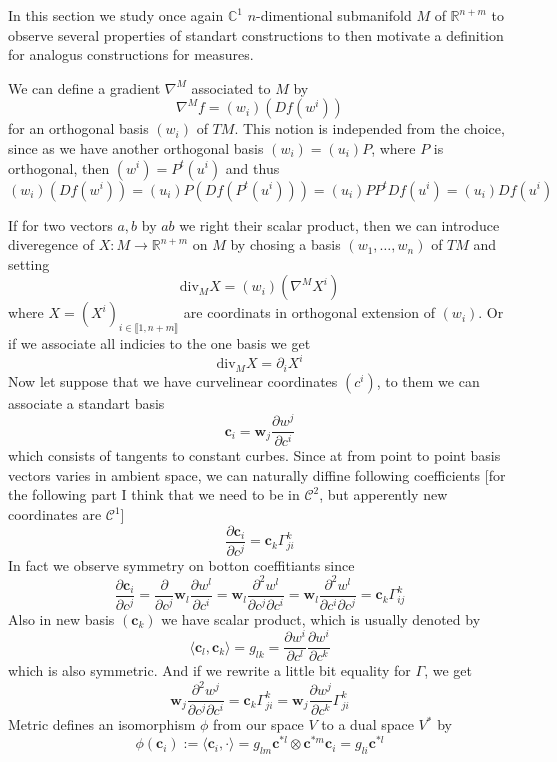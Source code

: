 In this section we study once again $\mathbb C^1$ $n$-dimentional submanifold $M$
of $\mathbb R^{n+m}$ to observe several properties of standart constructions to
then motivate a definition for analogus constructions for measures.

\vspace{2ex}
We can define a gradient $\nabla^M$ associated to $M$ by
\[\nabla^M f = (w_i)(Df(w^i))\]
for an orthogonal basis $(w_i)$ of $TM$. This notion is independed from the choice,
since as we have another orthogonal basis $(w_i)=(u_i)P$, where $P$ is orthogonal, 
then $(w^i)=P^t(u^i)$ and thus $(w_i)(Df(w^i))=(u_i)P(Df(P^t(u^i)))=(u_i)PP^tDf(u^i)=(u_i)Df(u^i)$

\vspace{2ex}
If for two vectors $a,b$ by $ab$ we right their scalar product, then we can
introduce diveregence of $X:M\rightarrow\mathbb R^{n+m}$ on $M$ by chosing
a basis $(w_1,\ldots,w_n)$ of $TM$ and setting
\[\text{div}_MX=(w_i)(\nabla^MX^i)\]
where $X=(X^i)_{i\in\llbracket1,n+m\rrbracket}$ are coordinats in orthogonal
extension of $(w_i)$. Or if we associate all indicies to the one basis we get
\[\text{div}_MX=\partial_iX^i\]
Now let suppose that we have curvelinear coordinates $(c^i)$, to them we can
associate a standart basis 
\[\mathbf{c}_i=\mathbf{w}_j\frac{\partial w^j}{\partial c^i}\]
which consists of tangents to constant curbes. Since at from point to point
basis vectors varies in ambient space, we can naturally diffine following coefficients
[for the following part I think that we need to be in $\mathcal C^2$, but apperently new coordinates
are $\mathcal C^1$]
\[\frac{\partial\mathbf{c}_i}{\partial c^j} = \mathbf{c}_k\Gamma_{ji}^k\]
In fact we observe symmetry on botton coeffitiants since
\[\frac{\partial\mathbf{c}_i}{\partial c^j} = \frac{\partial}{\partial c^j}\mathbf{w}_l\frac{\partial w^l}{\partial c^i}
=\mathbf{w}_l\frac{\partial^2 w^l}{\partial c^j\partial c^i}=\mathbf{w}_l\frac{\partial^2 w^l}{\partial c^i\partial c^j}
=\mathbf{c}_k\Gamma_{ij}^k\]
Also in new basis $(\mathbf{c}_k)$ we have scalar product, which is usually denoted by
\[\langle\mathbf{c}_l,\mathbf{c}_k\rangle=g_{lk}=\frac{\partial w^i}{\partial c^l}\frac{\partial w^i}{\partial c^k}\]
which is also symmetric. And if we rewrite a little bit equality for $\Gamma$, we get
\[\mathbf{w}_j\frac{\partial^2 w^j}{\partial c^j\partial c^i}=\mathbf{c}_k\Gamma_{ji}^k
=\mathbf{w}_j\frac{\partial w^j}{\partial c^k}\Gamma_{ji}^k\]
Metric defines an isomorphism $\phi$ from our space $V$ to a dual space $V^*$ by
\[\phi(\mathbf{c}_i):=\langle\mathbf{c}_i,\cdot\rangle=g_{lm}\mathbf{c}^{*l}\otimes\mathbf{c}^{*m}\mathbf{c}_i=g_{li}\mathbf{c}^{*l}\]
